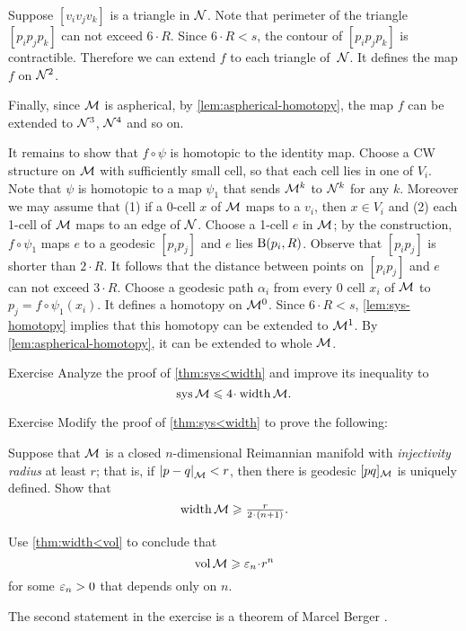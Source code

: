 Suppose $[v_iv_jv_k]$ is a triangle in $\mathcal{N}$.
Note that perimeter of the triangle $[p_ip_jp_k]$ can not exceed $6\cdot R$.
Since $6\cdot R<s$, the contour of $[p_ip_jp_k]$ is contractible.
Therefore we can extend $f$ to each triangle of~$\mathcal{N}$.
It defines the map $f$ on $\mathcal{N}^2$.

Finally, since $\mathcal{M}$ is aspherical, by \ref{lem:aspherical-homotopy}, the map $f$ can be extended to $\mathcal{N}^3$, $\mathcal{N}^4$ and so on.

It remains to show that $f\circ\psi$ is homotopic to the identity map.
Choose a CW structure on $\mathcal{M}$ with sufficiently small cell, so that each cell lies in one of $V_i$.
Note that $\psi$ is homotopic to a map $\psi_1$ that sends $\mathcal{M}^k$ to $\mathcal{N}^k$ for any $k$.
Moreover we may assume that (1) if a 0-cell $x$ of $\mathcal{M}$ maps to a $v_i$, then $x\in V_i$ and (2) each 1-cell  of $\mathcal{M}$ maps to an edge of $\mathcal{N}$.
Choose a 1-cell $e$ in $\mathcal{M}$; by the construction, $f\circ\psi_1$ maps $e$ to a geodesic $[p_ip_j]$ and $e$ lies $\mathrm{B}{}(p_i,R)$.
Observe that $[p_ip_j]$ is shorter than $2\cdot R$.
It follows that the distance between points on $[p_ip_j]$ and $e$ can not exceed $3\cdot R$.
Choose a geodesic path $\alpha_i$ from every 0 cell $x_i$  of $\mathcal{M}$ to $p_j=f\circ\psi_1(x_i)$.
It defines a homotopy on $\mathcal{M}^0$.
Since $6\cdot R<s$, \ref{lem:sys-homotopy} implies that this homotopy can be extended to $\mathcal{M}^1$.
By \ref{lem:aspherical-homotopy}, it can be extended to whole $\mathcal{M}$.
\qeds

\begin{thm}{Exercise}\label{ex:sys<width}
Analyze the proof of \ref{thm:sys<width} and improve its inequality to 
 \[\sys\spc{M}\le 4 \cdot \width \spc{M}.\]
\end{thm}

\begin{thm}{Exercise}\label{ex:fillrad-inj}
Modify the proof of \ref{thm:sys<width} to prove the following:

Suppose that $\mathcal{M}$ is a closed $n$-dimensional Reimannian manifold with \emph{injectivity radius} at least $r$; that is, if $\dist{p}{q}{\spc{M}}<r$, then there is geodesic $[pq]_{\mathcal{M}}$ is uniquely defined.
Show that
\[\width\spc{M}\ge \tfrac{r}{2\cdot(n+1)}.\]

Use \ref{thm:width<vol} to conclude that  
\[\vol\spc{M}\ge \eps_n \cdot r^n \]
for some $\varepsilon_n>0$ that depends only on $n$.
\end{thm} 

The second statement in the exercise is a theorem of Marcel Berger \cite{berger-n}.


